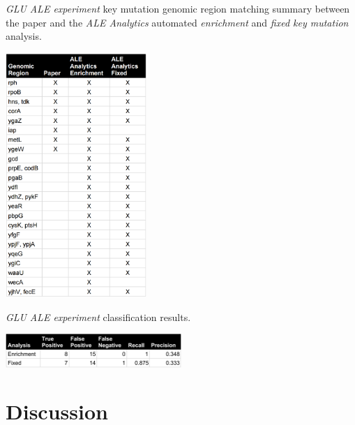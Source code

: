 \documentclass[12pt,final,masters,chapterheads]{ucsd}  %
\begin{document}
\begin{table}[H]
  \caption{\textit{GLU} \textit{ALE experiment} {key mutation} genomic region matching summary between the paper and the \textit{ALE Analytics} automated \textit{enrichment} and \textit{fixed key mutation} analysis.}
  \centering
  \includegraphics[width=0.4\textwidth]{glu_key_mutation_regions.png}
\end{table}
\begin{table}[H]
  \centering
   \caption{\textit{GLU} \textit{ALE experiment} classification results.}
  \includegraphics[width=0.5\textwidth]{glu_precision_recall.png}
\end{table}

\chapter{Discussion}
%
%
%
%
%
%
%
%
%
%
\end{document}
